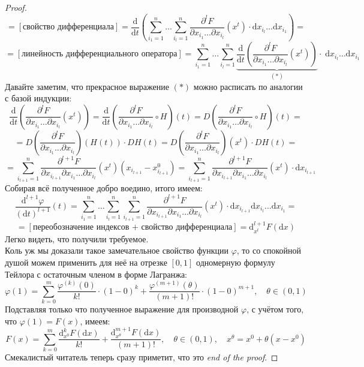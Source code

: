 \documentclass[11pt]{article}
\begin{document}
\begin{proof}
    \[ = [\text{свойство дифференциала}] = \frac{\mathrm{d}}{\mathrm{d} t} \left(\sum_{i_1 = 1}^n \ldots \sum_{i_l = 1}^n \frac{\partial^l F}{\partial x_{i_1} \ldots \partial x_{i_l}} \left(x^t\right) \cdot \mathrm{d} x_{i_l} \ldots \mathrm{d} x_{i_1}\right) = \]
    \[ = [\text{линейность дифференциального оператора}] = \sum_{i_1 = 1}^n \ldots \sum_{i_l = 1}^n \underbrace{\frac{\mathrm{d}}{\mathrm{d} t} \left(\frac{\partial^l F}{\partial x_{i_1} \ldots \partial x_{i_l}} \left(x^t\right)\right)}_{(\ast)} \cdot \; \mathrm{d} x_{i_l} \ldots \mathrm{d} x_{i_1}\]
    Давайте заметим, что прекрасное выражение $(\ast)$ можно расписать по аналогии с базой индукции:
    \[\frac{\mathrm{d}}{\mathrm{d} t} \left(\frac{\partial^l F}{\partial x_{i_1} \ldots \partial x_{i_l}} \left(x^t\right)\right) = \frac{\mathrm{d}}{\mathrm{d} t} \left(\frac{\partial^l F}{\partial x_{i_1} \ldots \partial x_{i_l}} \circ H \right) \left(t\right) = D \left(\frac{\partial^l F}{\partial x_{i_1} \ldots \partial x_{i_l}} \circ H \right) \left(t\right) = \]
    \[= D \left(\frac{\partial^l F}{\partial x_{i_1} \ldots \partial x_{i_l}}\right) \left(H(t)\right) \cdot D H(t) = D \left(\frac{\partial^l F}{\partial x_{i_1} \ldots \partial x_{i_l}}\right) \left(x^t\right) \cdot D H(t) = \]
    \[= \sum_{i_{l + 1} = 1}^n \frac{\partial^{l + 1} F}{\partial x_{i_{l + 1}} \partial x_{i_1} \ldots \partial x_{i_l}} \left(x^t\right) \left(x_{i_{l + 1}} - x_{i_{l + 1}}^0\right) = \sum_{i_{l + 1} = 1}^n \frac{\partial^{l + 1} F}{\partial x_{i_{l + 1}} \partial x_{i_1} \ldots \partial x_{i_l}} \left(x^t\right) \cdot \mathrm{d} x_{i_{l + 1}}\]
    Собирая всё полученное добро воедино, итого имеем:
    \[\frac{\mathrm{d}^{l + 1} \varphi}{(\mathrm{d} t)^{l + 1}}(t) = \sum_{i_1 = 1}^n \ldots \sum_{i_l = 1}^n \sum_{i_{l + 1} = 1}^n \frac{\partial^{l + 1} F}{\partial x_{i_{l + 1}} \partial x_{i_1} \ldots \partial x_{i_l}} \left(x^t\right) \cdot \mathrm{d} x_{i_{l + 1}} \mathrm{d} x_{i_l} \ldots \mathrm{d} x_{i_1} = \]
    \[= [\text{переобозначение индексов + свойство дифференциала}] = \mathrm{d}_{x^t}^{l + 1} F (\mathrm{d} x)\]
    Легко видеть, что получили требуемое. 
    \\
    Коль уж мы доказали такое замечательное свойство функции $\varphi$, то со спокойной душой можем 
    применить для неё на отрезке $[0, 1]$ одномерную формулу Тейлора с остаточным членом в форме Лагранжа:
    \[\varphi(1) = \sum_{k = 0}^m \frac{\varphi^{(k)}(0)}{k!} \cdot (1 - 0)^k + \frac{\varphi^{(m + 1)}(\theta)}{(m + 1)!} \cdot (1 - 0)^{m + 1}, \quad \theta \in (0, 1)\]
    Подставляя только что полученное выражение для производной $\varphi$, с учётом того, что $\varphi(1) = F(x)$, имеем:
    \[F(x) = \sum_{k = 0}^m \frac{\mathrm{d}_{x^0}^k F (\mathrm{d} x)}{k!} + \frac{\mathrm{d}_{x^{\theta}}^{m + 1} F (\mathrm{d} x)}{(m + 1)!}, \quad \theta \in (0, 1), \quad x^{\theta} = x^0 + \theta \left(x - x^0\right)\]
    Смекалистый читатель теперь сразу приметит, что это \textit{end of the proof}.
\end{proof}
\end{document}
